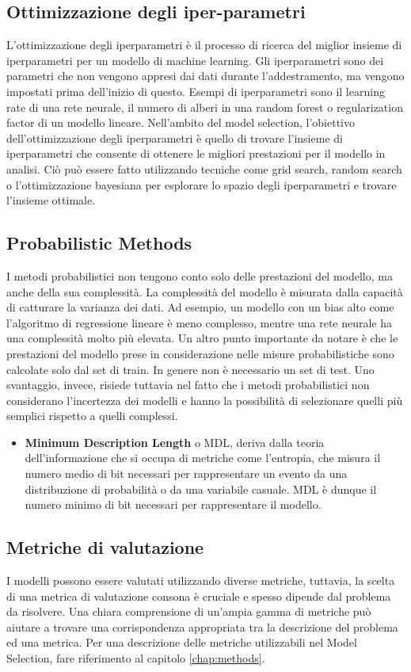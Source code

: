 \subsection{Ottimizzazione degli iper-parametri}
L'ottimizzazione degli iperparametri è il processo di ricerca del miglior insieme di iperparametri per un modello di machine learning. Gli iperparametri sono dei parametri che non vengono appresi dai dati durante l'addestramento, ma vengono impostati prima dell'inizio di questo. Esempi di iperparametri sono il learning rate di una rete neurale, il numero di alberi in una random forest o regularization factor di un modello lineare. Nell'ambito del model selection, l'obiettivo dell'ottimizzazione degli iperparametri è quello di trovare l'insieme di iperparametri che consente di ottenere le migliori prestazioni per il modello in analisi. Ciò può essere fatto utilizzando tecniche come grid search, random search o l'ottimizzazione bayesiana per esplorare lo spazio degli iperparametri e trovare l'insieme ottimale.


\subsection{Probabilistic Methods}
I metodi probabilistici non tengono conto solo delle prestazioni del modello, ma anche della sua complessità. La complessità del modello è misurata dalla capacità di catturare la varianza dei dati. 
Ad esempio, un modello con un bias alto come l'algoritmo di regressione lineare è meno complesso, mentre una rete neurale ha una complessità molto più elevata.
Un altro punto importante da notare è che le prestazioni del modello prese in considerazione nelle misure probabilistiche sono calcolate solo dal set di train. In genere non è necessario un set di test.
Uno svantaggio, invece, risiede tuttavia nel fatto che i metodi probabilistici non considerano l'incertezza dei modelli e hanno la possibilità di selezionare  quelli più semplici rispetto a quelli complessi.
\begin{itemize}
	\item \textbf{Minimum Description Length} o MDL, deriva dalla teoria dell'informazione che si occupa di metriche come l'entropia, che misura il numero medio di bit necessari per rappresentare un evento da una distribuzione di probabilità o da una variabile casuale. 
	      MDL è dunque il numero minimo di bit necessari per rappresentare il modello.
\end{itemize}

\subsection{Metriche di valutazione}
I modelli possono essere valutati utilizzando diverse metriche, tuttavia, la scelta di una metrica di valutazione consona è cruciale e spesso dipende dal problema da risolvere. Una chiara comprensione di un'ampia gamma di metriche può aiutare a trovare una corrispondenza appropriata tra la descrizione del problema ed una metrica.
Per una descrizione delle metriche utilizzabili nel Model Selection, fare riferimento al capitolo \ref{chap:methods}.

